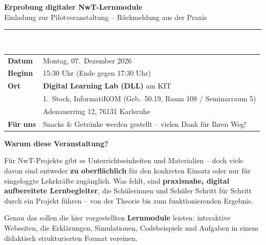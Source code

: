 \documentclass[a4paper,10pt]{article}
\newcommand{\linefill}{\rule{\linewidth}{0.4pt}}
\newcommand{\sectionrule}{%
  \vspace{2pt}{\color{accent}\rule{\linewidth}{1.5pt}}\vspace{4pt}}
\begin{document}
{\LARGE \bfseries \color{primary} Erprobung digitaler NwT-Lernmodule}\\[3pt]
{\large \color{accent} Einladung zur Pilotveranstaltung – Rückmeldung aus der Praxis}\\[6pt]
\linefill\\[6pt]

\begin{tcolorbox}[
  colback=accentlight,
  colframe=accent,
  arc=2mm,
  boxrule=1pt,
  top=6pt, bottom=6pt, left=10pt, right=10pt,
  title={\bfseries\color{white} Termin \& Ort},
  coltitle=white,
  attach boxed title to top left={yshift=-2mm, xshift=4mm},
  boxed title style={colback=accent, arc=1mm}
]
\begin{tabularx}{\linewidth}{@{}lX@{}}
  \textbf{Datum}   & Montag, 07.\ Dezember 2026 \\[2pt]
  \textbf{Beginn}  & 15:30 Uhr (Ende gegen 17:30 Uhr) \\[2pt]
  \textbf{Ort}     & \textbf{Digital Learning Lab (DLL)} am KIT \\
                   & 1.\ Stock, InformatiKOM (Geb.\ 50.19, Raum 108 / Seminarraum 5) \\
                   & Adenauerring 12, 76131 Karlsruhe \\[2pt]
  \textbf{Für uns} & Snacks \& Getränke werden gestellt – vielen Dank für Ihren Weg!
\end{tabularx}
\end{tcolorbox}

\vspace{10pt}

{\large \bfseries \color{primary} Warum diese Veranstaltung?}
\sectionrule

Für NwT-Projekte gibt es Unterrichtseinheiten und Materialien –
doch viele davon sind entweder \textbf{zu oberflächlich} für den konkreten Einsatz
oder nur für eingeloggte Lehrkräfte zugänglich.
Was fehlt, sind \textbf{praxisnahe, digital aufbereitete Lernbegleiter},
die Schülerinnen und Schüler Schritt für Schritt durch ein Projekt führen –
von der Theorie bis zum funktionierenden Ergebnis.

\vspace{6pt}

Genau das sollen die hier vorgestellten \textbf{Lernmodule} leisten:
interaktive Webseiten, die Erklärungen, Simulationen, Codebeispiele
und Aufgaben in einem didaktisch strukturierten Format vereinen.
\end{document}
